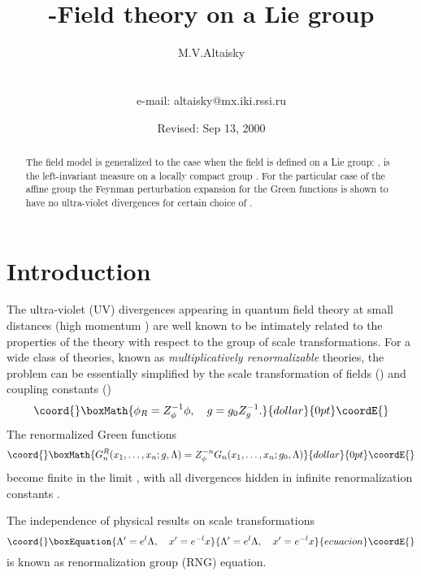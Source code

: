 \documentclass[a4paper,a4paper]{article}
\providecommand{\R}{\mathbb{R}}
\begin{document}
\title{\coordHE{}-Field theory on a Lie group}
\author{M.V.Altaisky \\
 \\
 \\ e-mail: altaisky@mx.iki.rssi.ru}
\date{Revised: Sep 13, 2000}
\maketitle
\begin{abstract}
The \coordHE{} field model is generalized to the case when 
the field \coordHE{} is defined on a Lie group: 
\coordHE{},  
\coordHE{} is the left-invariant measure on a locally compact group \coordHE{}. 
For the particular case of the affine group \myHighlight{$G:x'=ax+b,a\in\R_+, x,b \in \R^n$}\coordHE{} the Feynman 
perturbation expansion for the Green functions is shown to have no 
ultra-violet divergences for certain 
choice of \coordHE{}. 
\end{abstract}
\section{Introduction}
The ultra-violet (UV) divergences appearing in quantum field theory at small distances 
(high momentum \myHighlight{$\Lambda\to\infty$}\coordHE{}) are well known to be 
intimately related to the properties of the theory with respect to 
the group of scale transformations. For a wide class of theories, 
known as {\em multiplicatively renormalizable} theories, the problem 
can be essentially simplified by the scale transformation of fields
(\myHighlight{$\phi$}\coordHE{}) and coupling constants (\coordHE{})  
$$\coord{}\boxMath{\phi_R = Z^{-1}_\phi \phi,\quad g = g_0 Z^{-1}_g.}{dollar}{0pt}\coordE{}$$
The renormalized Green functions 
$$\coord{}\boxMath{
G_n^R(x_1,\ldots,x_n;g,\Lambda) = Z_\phi^{-n}G_n(x_1,\ldots,x_n;g_0,\Lambda)
}{dollar}{0pt}\coordE{}$$
become finite in the limit \myHighlight{$\Lambda\to\infty$}\coordHE{}, with all divergences 
hidden in infinite renormalization constants 
\coordHE{}. 

The independence of physical results on scale transformations 
\begin{equation}\coord{}\boxEquation{ 
\Lambda'=e^l \Lambda, \quad x' = e^{-l}x
\label{sct}
}{ 
\Lambda'=e^l \Lambda, \quad x' = e^{-l}x
}{ecuacion}\coordE{}\end{equation}
is known as renormalization group (RNG) equation. 
\end{document}
